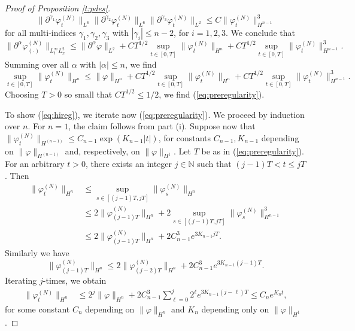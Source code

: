 \documentclass[11pt,a4paper]{article}
\newcommand{\done}{}
\newcommand{\bN}{{\mathbb N}}
\begin{document}
\begin{proof}[Proof of Proposition \ref{t:pdes}]
\[  \| \partial^{\gamma_1} \varphi_t^{(N)} \|_{L^6} \| \partial^{\gamma_2} \varphi_t^{(N)} \|_{L^6} \| \partial^{\gamma_3} \varphi_t^{(N)} \|_{L^2} \leq C \| \varphi_t^{(N)} \|_{H^{n-1}}^3 \]
for all multi-indices $\gamma_1, \gamma_2, \gamma_3$ with $|\gamma_i| \leq n-2$, for $i=1,2,3$. We conclude that
\[ \| \partial^\alpha \varphi^{(N)}_{(\cdot)} \|_{L_t^\infty L_x^2} \leq  \|
    \partial^\alpha \varphi \|_{L^2} + C T^{1/2} \sup_{t \in [0,T]} \| \varphi_t^{(N)} \|_{H^n} + C T^{1/2} \sup_{t \in [0,T]} \| \varphi_t^{(N)} \|_{H^{n-1}}^3. \]   
Summing over all $\alpha$ with $|\alpha| \leq n$, we find
\[ \sup_{t \in [0,T]} \| \varphi^{(N)}_{t} \|_{H^n} \leq  \| \varphi \|_{H^n} + C T^{1/2} \sup_{t \in [0,T]} \| \varphi_t^{(N)} \|_{H^n} + C T^{1/2} \sup_{t \in [0,T]} \| \varphi_t^{(N)} \|_{H^{n-1}}^3. \]  
Choosing $T > 0$ so small that $CT^{1/2} \leq 1/2$, we find (\ref{eq:preregularity}).

To show (\ref{eq:hireg}), we iterate now (\ref{eq:preregularity}). We proceed by induction over $n$. For $n =1$, the claim follows from part (i). Suppose now that $\| \varphi^{(N)}_t \|_{H^{(n-1)}} \leq C_{n-1} \exp (K_{n-1} |t|)$, for constants $C_{n-1}, K_{n-1}$ depending on $\| \varphi \|_{H^{(n-1)}}$ and, respectively, on $\| \varphi \|_{H^1}$. Let $T$ be as in (\ref{eq:preregularity}). For an arbitrary $t >0$, there exists an integer $j \in \bN$ such that $(j-1) T < t \leq jT$. Then
  \begin{align*}
    \| \varphi_t^{(N)} \|_{H^n} & \le \sup_{s \in [(j-1)T, jT]} \| \varphi_s^{(N)}
    \|_{H^n}\done \\
    & \le 2 \| \varphi_{(j-1)T}^{(N)} \|_{H^n} + 2\sup_{s \in [(j-1)T, jT]} \|
    \varphi_s^{(N)} \|_{H^{n-1}}^3 \\
    & \le 2 \| \varphi_{(j-1)T}^{(N)} \|_{H^n} + 2 C_{n-1}^3 e^{3 K_{n-1} j T}.
  \end{align*}
Similarly we have
  \[
    \| \varphi_{(j-1)T}^{(N)} \|_{H^n} \le 2 \|
    \varphi_{(j-2)T}^{(N)} \|_{H^n} + 2 C_{n-1}^3  e^{3 K_{n-1} (j-1)T}.\done
  \]
Iterating $j$-times, we obtain
  \begin{align*}
    \| \varphi_t^{(N)} \|_{H^n} & \le 2^j \| \varphi \|_{H^n} + 2 C_{n-1}^3
    \sum_{\ell=0}^j 2^{\ell} e^{3 K_{n-1} (j-\ell)T} \le C_n e^{K_n t},\done
  \end{align*}
  for some constant $C_n$ depending on $\| \varphi \|_{H^n}$ and $K_n$ depending only on $\| \varphi \|_{H^1}$.


\end{proof}
\end{document}
